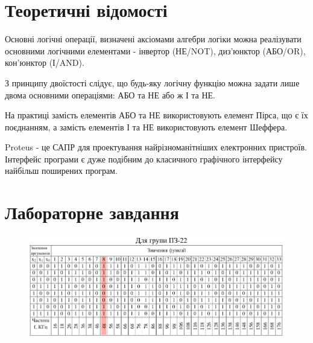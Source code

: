\documentclass{article}
\begin{document}
\begin{normalsize}
	\section*{Теоретичні відомості}
	Основні логічні операції, визначені аксіомами алгебри логіки можна реалізувати основними логічними елементами - інвертор (НЕ/NOT), диз'юнктор (АБО/OR), кон'юнктор (І/AND).
	
	З принципу двоїстості слідує, що будь-яку логічну функцію можна задати лише двома основними операціями: АБО та НЕ або ж І та НЕ.
	
	На практиці замість елементів АБО та НЕ використовують елемент Пірса, що є їх поєднанням, а замість елементів І та НЕ використовують елемент Шеффера.
	
	Proteus - це САПР для проектування найрізноманітніших електронних пристроїв.
	Інтерфейс програми є дуже подібним до класичного графічного інтерфейсу найбільш поширених програм.
	
	\section*{Лабораторне завдання}
	\begin{figure}[H]
		\centering
		\includegraphics[scale=0.75]{v}
	\end{figure}	
	

\end{normalsize}
\end{document}
